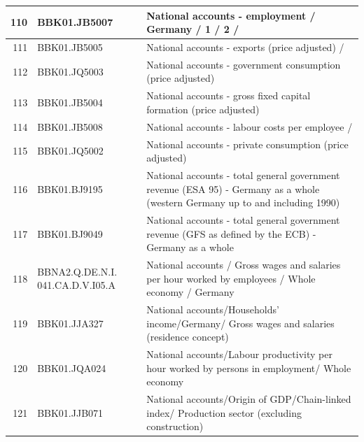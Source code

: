 \documentclass[11pt]{article}
\begin{document}
\begin{table}
\begin{tabular}{rp{5cm}p{11cm}}
  \hline  110 & BBK01.JB5007 & National accounts - employment / Germany / 1 / 2 / \\ 
  \hline
  111 & BBK01.JB5005 & National accounts - exports (price adjusted) / \\ 
  \hline
  112 & BBK01.JQ5003 & National accounts - government consumption (price adjusted) \\ 
  \hline
  113 & BBK01.JB5004 & National accounts - gross fixed capital formation (price adjusted) \\ 
  \hline
  114 & BBK01.JB5008 & National accounts - labour costs per employee / \\ 
  \hline
  115 & BBK01.JQ5002 & National accounts - private consumption (price adjusted) \\ 
  \hline
  116 & BBK01.BJ9195 & National accounts - total general government revenue (ESA 95) - Germany as a whole (western Germany up to and including 1990) \\ 
  \hline
  117 & BBK01.BJ9049 & National accounts - total general government revenue (GFS as defined by the ECB) - Germany as a whole \\ 
  \hline
  118 & BBNA2.Q.DE.N.I. 041.CA.D.V.I05.A & National accounts / Gross wages and salaries per hour worked by employees /  Whole economy / Germany \\ 
  \hline
  119 & BBK01.JJA327 & National accounts/Households' income/Germany/ Gross wages and salaries (residence concept) \\ 
  \hline
  120 & BBK01.JQA024 & National accounts/Labour productivity per hour worked by persons in employment/ Whole economy \\ 
  \hline
  121 & BBK01.JJB071 & National accounts/Origin of GDP/Chain-linked index/ Production sector (excluding construction) \\ 
\end{tabular}
\end{table}
\end{document}
